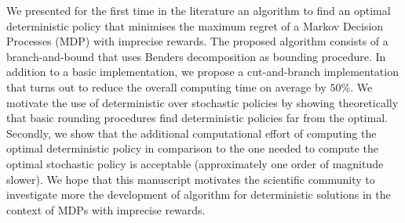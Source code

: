 We presented for the first time in the literature an algorithm to find an optimal deterministic policy that minimises the maximum regret of a Markov Decision Processes (MDP) with imprecise rewards.
The proposed algorithm consists of a branch-and-bound that uses Benders decomposition as bounding procedure. In addition to a basic implementation, we propose a cut-and-branch implementation that turns out to reduce the overall computing time on average by $50\%$.  
We motivate the use of deterministic over stochastic policies by showing theoretically that basic rounding procedures find deterministic policies far from the optimal. Secondly, we show that the additional computational effort of computing the optimal deterministic policy in comparison to the one needed to compute the optimal stochastic policy is acceptable (approximately one order of magnitude slower).
We hope that this manuscript motivates the scientific community to investigate more the development of algorithm for deterministic solutions in the context of MDPs with imprecise rewards. 

